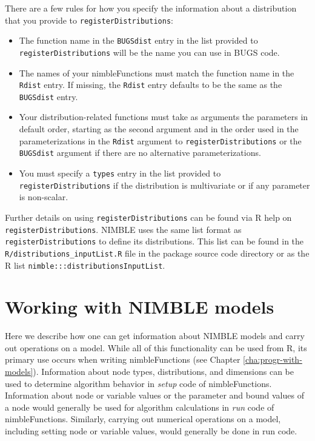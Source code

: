 \documentclass[12pt,oneside]{book}\usepackage[]{graphicx}\usepackage[]{color}
\def\cd#1{\texttt{#1}}
\def\nm#1{\textit{#1}}
\begin{document}
There are a few rules for how you specify the information about a
distribution that you provide to \cd{registerDistributions}:

     \begin{itemize}
\item The function name in the \cd{BUGSdist} entry in the list provided to \cd{registerDistributions} will be the name you can use in BUGS code.
\item The names of your nimbleFunctions must match the function name in the \cd{Rdist} entry.  If missing, the \cd{Rdist} entry defaults to be the same as the \cd{BUGSdist} entry.
\item Your distribution-related functions must take as arguments the
  parameters in default order, starting as the second argument and in the order used in the parameterizations in the \cd{Rdist} argument to \cd{registerDistributions} or the \cd{BUGSdist} argument if there are no alternative parameterizations. 
\item You must specify a \cd{types} entry in the list provided to \cd{registerDistributions} if the distribution is multivariate or if any parameter is non-scalar.
 \end{itemize}

Further details on using \cd{registerDistributions} can be found via R help on \cd{registerDistributions}.  NIMBLE uses the same list format as \cd{registerDistributions} to define its distributions.  This list can be found in the \cd{R/distributions\_inputList.R} file in the package source code directory or as the R list \cd{nimble:::distributionsInputList}.







\chapter{Working with NIMBLE models}
\label{cha:using-bugs-models}

Here we describe how one can get information about NIMBLE models and
carry out operations on a model. While all of this functionality can
be used from R, its primary use occurs when writing nimbleFunctions (see Chapter \ref{cha:progr-with-models}). 
Information about node types, distributions, and dimensions can be
used to determine algorithm behavior in \nm{setup} code of nimbleFunctions. Information
about node or variable values or the parameter and bound values of a node would generally be used for algorithm
calculations in \nm{run} code of nimbleFunctions. Similarly, carrying out numerical operations
on a model, including setting node or variable values, would generally be done in run code.
\end{document}
